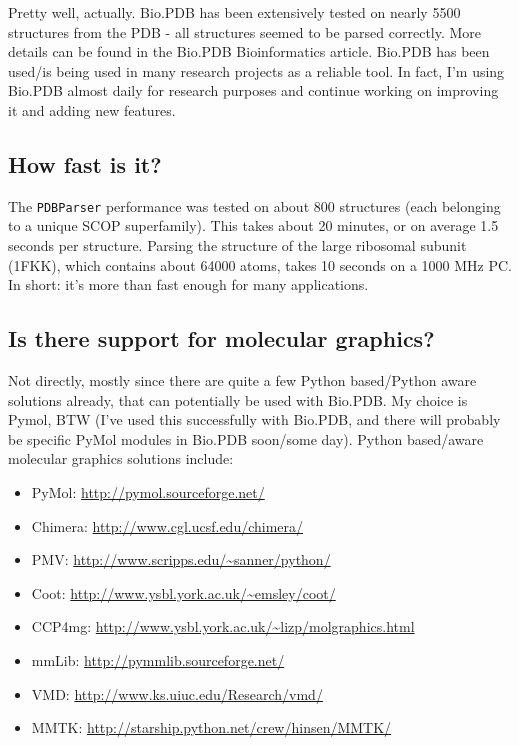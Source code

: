 \documentclass{report}
\begin{document}
Pretty well, actually. Bio.PDB has been extensively tested on nearly
5500 structures from the PDB - all structures seemed to be parsed
correctly. More details can be found in the Bio.PDB Bioinformatics
article. Bio.PDB has been used/is being used in many research projects
as a reliable tool. In fact, I'm using Bio.PDB almost daily for research
purposes and continue working on improving it and adding new features.

\subsection{How fast is it?}

The \texttt{PDBParser} performance was tested on about 800 structures
(each belonging to a unique SCOP superfamily). This takes about 20
minutes, or on average 1.5 seconds per structure. Parsing the structure
of the large ribosomal subunit (1FKK), which contains about 64000
atoms, takes 10 seconds on a 1000 MHz PC. In short: it's more than
fast enough for many applications.

\subsection{Is there support for molecular graphics?}

Not directly, mostly since there are quite a few Python based/Python
aware solutions already, that can potentially be used with Bio.PDB.
My choice is Pymol, BTW (I've used this successfully with Bio.PDB,
and there will probably be specific PyMol modules in Bio.PDB soon/some
day). Python based/aware molecular graphics solutions include:

\begin{itemize}
\item PyMol: \url{http://pymol.sourceforge.net/}
\item Chimera: \url{http://www.cgl.ucsf.edu/chimera/}
\item PMV: \url{http://www.scripps.edu/~sanner/python/}
\item Coot: \url{http://www.ysbl.york.ac.uk/~emsley/coot/}
\item CCP4mg: \url{http://www.ysbl.york.ac.uk/~lizp/molgraphics.html}
\item mmLib: \url{http://pymmlib.sourceforge.net/} 
\item VMD: \url{http://www.ks.uiuc.edu/Research/vmd/}
\item MMTK: \url{http://starship.python.net/crew/hinsen/MMTK/}
\end{itemize}
\end{document}
